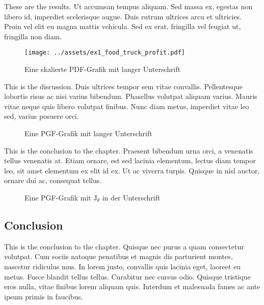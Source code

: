 These are the results. Ut accumsan tempus aliquam. Sed massa ex,
egestas non libero id, imperdiet scelerisque augue. Duis rutrum
ultrices arcu et ultricies. Proin vel elit eu magna mattis vehicula.
Sed ex erat, fringilla vel feugiat ut, fringilla non diam.

\begin{figure}[]
\hypertarget{ref_a_scaled_pdf_figure}{%
\centering
\texttt{[image: ../assets/ex1\_food\_truck\_profit.pdf]}
\caption[Eine skalierte PDF-Grafik]{Eine skalierte PDF-Grafik mit langer Unterschrift
\autocite[vgl.][13]{Perez_PythonEcosystem_2011}}\label{ref_a_scaled_pdf_figure}
}
\end{figure}

This is the discussion. Duis ultrices tempor sem vitae convallis.
Pellentesque lobortis risus ac nisi varius bibendum. Phasellus
volutpat aliquam varius. Mauris vitae neque quis libero volutpat
finibus. Nunc diam metus, imperdiet vitae leo sed, varius posuere
orci.

\begin{figure}[]
\hypertarget{ref_a_pgf_figure}{%
\centering

\caption[Eine PGF-Grafik]{Eine PGF-Grafik mit langer Unterschrift}\label{ref_a_pgf_figure}
}
\end{figure}

This is the conclusion to the chapter. Praesent bibendum urna orci,
a venenatis tellus venenatis at. Etiam ornare, est sed lacinia
elementum, lectus diam tempor leo, sit amet elementum ex elit id ex.
Ut ac viverra turpis. Quisque in nisl auctor, ornare dui ac,
consequat tellus.

\begin{figure}[]
\hypertarget{ref_a_mathy_pgf_figure}{%
\centering

\caption[Eine PGF-Grafik mit \(\mathrm{J}_\theta\)]{Eine PGF-Grafik mit \(\mathrm{J}_\theta\) in der Unterschrift}\label{ref_a_mathy_pgf_figure}
}
\end{figure}

\hypertarget{conclusion-1}{%
\subsection{Conclusion}\label{conclusion-1}}

This is the conclusion to the chapter. Quisque nec purus a quam
consectetur volutpat. Cum sociis natoque penatibus et magnis dis
parturient montes, nascetur ridiculus mus. In lorem justo, convallis
quis lacinia eget, laoreet eu metus. Fusce blandit tellus tellus.
Curabitur nec cursus odio. Quisque tristique eros nulla, vitae
finibus lorem aliquam quis. Interdum et malesuada fames ac ante
ipsum primis in faucibus.

